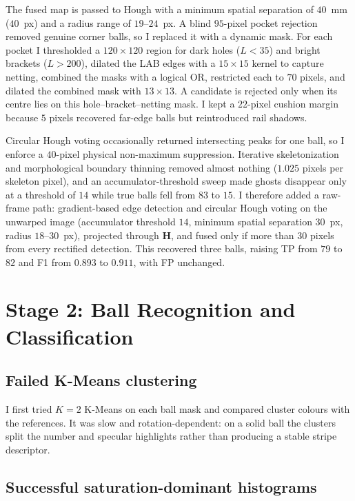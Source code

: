 \documentclass[12pt,a4paper]{article}
\begin{document}
The fused map is passed to Hough with a minimum spatial separation of $40$~mm ($40$~px) and a radius range of $19$--$24$~px. A blind $95$-pixel pocket rejection removed genuine corner balls, so I replaced it with a dynamic mask. For each pocket I thresholded a $120\times120$ region for dark holes ($L<35$) and bright brackets ($L>200$), dilated the LAB edges with a $15\times15$ kernel to capture netting, combined the masks with a logical OR, restricted each to $70$ pixels, and dilated the combined mask with $13\times13$. A candidate is rejected only when its centre lies on this hole--bracket--netting mask. I kept a $22$-pixel cushion margin because $5$ pixels recovered far-edge balls but reintroduced rail shadows.

Circular Hough voting occasionally returned intersecting peaks for one ball, so I enforce a $40$-pixel physical non-maximum suppression. Iterative skeletonization and morphological boundary thinning removed almost nothing ($1.025$ pixels per skeleton pixel), and an accumulator-threshold sweep made ghosts disappear only at a threshold of $14$ while true balls fell from $83$ to $15$. I therefore added a raw-frame path: gradient-based edge detection and circular Hough voting on the unwarped image (accumulator threshold $14$, minimum spatial separation $30$~px, radius $18$--$30$~px), projected through $\mathbf{H}$, and fused only if more than $30$ pixels from every rectified detection. This recovered three balls, raising TP from $79$ to $82$ and F1 from $0.893$ to $0.911$, with FP unchanged.

\section{Stage 2: Ball Recognition and Classification}

\subsection{Failed K-Means clustering}

I first tried $K=2$ K-Means on each ball mask and compared cluster colours with the references. It was slow and rotation-dependent: on a solid ball the clusters split the number and specular highlights rather than producing a stable stripe descriptor.

\subsection{Successful saturation-dominant histograms}
\end{document}
